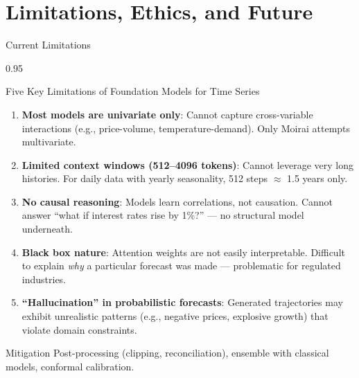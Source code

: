 \documentclass[9pt, aspectratio=169, t]{beamer}
\begin{document}
\section{Limitations, Ethics, and Future}

\begin{frame}{Current Limitations}
    \begin{cminipage}{0.95\textwidth}
    \vspace{-2mm}
    \begin{alertblock}{Five Key Limitations of Foundation Models for Time Series}
        {\small
        \begin{enumerate}\setlength{\itemsep}{2pt}
            \item \textbf{Most models are univariate only}: Cannot capture cross-variable interactions (e.g., price-volume, temperature-demand). Only Moirai attempts multivariate.
            \item \textbf{Limited context windows (512--4096 tokens)}: Cannot leverage very long histories. For daily data with yearly seasonality, 512 steps $\approx$ 1.5 years only.
            \item \textbf{No causal reasoning}: Models learn correlations, not causation. Cannot answer ``what if interest rates rise by 1\%?'' --- no structural model underneath.
            \item \textbf{Black box nature}: Attention weights are not easily interpretable. Difficult to explain \textit{why} a particular forecast was made --- problematic for regulated industries.
            \item \textbf{``Hallucination'' in probabilistic forecasts}: Generated trajectories may exhibit unrealistic patterns (e.g., negative prices, explosive growth) that violate domain constraints.
        \end{enumerate}
        }
    \end{alertblock}
    \vspace{-2mm}
    \begin{exampleblock}{Mitigation}
        {\small Post-processing (clipping, reconciliation), ensemble with classical models, conformal calibration.}
    \end{exampleblock}
    \end{cminipage}
\end{frame}
\end{document}
